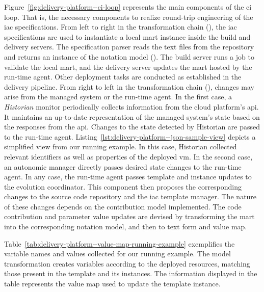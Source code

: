 Figure~\ref{fig:delivery-platform--ci-loop} represents the main components of the \gls{ci} loop. That is, the necessary components to realize round-trip engineering of the \gls{iac} specifications. From left to right in the transformation chain (), the \gls{iac} specifications are used to instantiate a local \gls{mart} instance inside the build and delivery servers. The specification parser reads the text files from the repository and returns an instance of the notation model (). The build server runs a job to validate the local \gls{mart}, and the delivery server updates the \gls{mart} hosted by the run-time agent. Other deployment tasks are conducted as established in the delivery pipeline. From right to left in the transformation chain (), changes may arise from the managed system or the run-time agent. In the first case, a \emph{Historian} monitor periodically collects information from the cloud platform's \gls{api}. It maintains an up-to-date representation of the managed system's state based on the responses from the \gls{api}. Changes to the state detected by Historian are passed to the run-time agent. Listing~\ref{lst:delivery-platform--json-sample-view} depicts a simplified view from our running example. In this case, Historian collected relevant identifiers as well as properties of the deployed \gls{vm}. In the second case, an autonomic manager directly passes desired state changes to the run-time agent. In any case, the run-time agent passes template and instance updates to the evolution coordinator. This component then proposes the corresponding changes to the source code repository and the \gls{iac} template manager. The nature of these changes depends on the contribution model implemented. The code contribution and parameter value updates are devised by transforming the \gls{mart} into the corresponding notation model, and then to text form and value map.

Table~\ref{tab:delivery-platform--value-map-running-example} exemplifies the variable names and values collected for our running example. The model transformation creates variables according to the deployed resources, matching those present in the template and its instances. The information displayed in the table represents the value map used to update the template instance.


